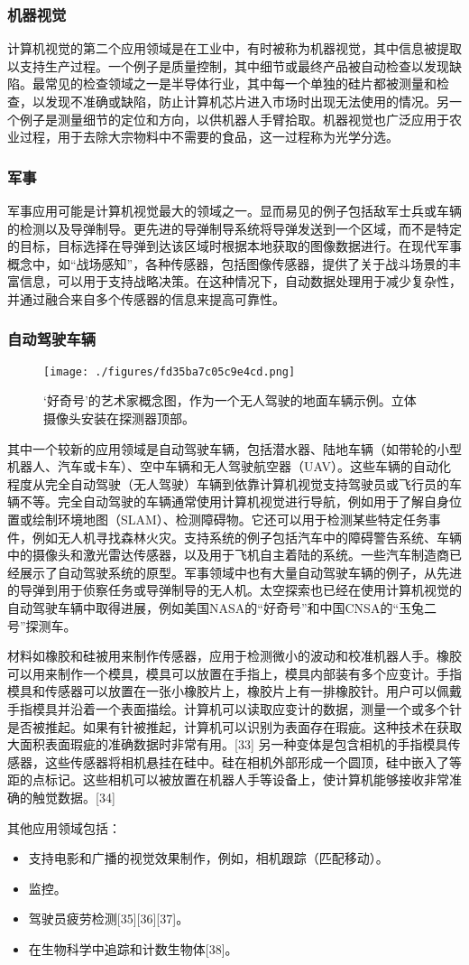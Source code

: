 \subsubsection{机器视觉}
计算机视觉的第二个应用领域是在工业中，有时被称为机器视觉，其中信息被提取以支持生产过程。一个例子是质量控制，其中细节或最终产品被自动检查以发现缺陷。最常见的检查领域之一是半导体行业，其中每一个单独的硅片都被测量和检查，以发现不准确或缺陷，防止计算机芯片进入市场时出现无法使用的情况。另一个例子是测量细节的定位和方向，以供机器人手臂拾取。机器视觉也广泛应用于农业过程，用于去除大宗物料中不需要的食品，这一过程称为光学分选。
\subsubsection{军事}
军事应用可能是计算机视觉最大的领域之一。显而易见的例子包括敌军士兵或车辆的检测以及导弹制导。更先进的导弹制导系统将导弹发送到一个区域，而不是特定的目标，目标选择在导弹到达该区域时根据本地获取的图像数据进行。在现代军事概念中，如“战场感知”，各种传感器，包括图像传感器，提供了关于战斗场景的丰富信息，可以用于支持战略决策。在这种情况下，自动数据处理用于减少复杂性，并通过融合来自多个传感器的信息来提高可靠性。
\subsubsection{自动驾驶车辆}
\begin{figure}[ht]
\centering
\texttt{[image: ./figures/fd35ba7c05c9e4cd.png]}
\caption{‘好奇号’的艺术家概念图，作为一个无人驾驶的地面车辆示例。立体摄像头安装在探测器顶部。} \label{fig_JSJ_5}
\end{figure}
其中一个较新的应用领域是自动驾驶车辆，包括潜水器、陆地车辆（如带轮的小型机器人、汽车或卡车）、空中车辆和无人驾驶航空器（UAV）。这些车辆的自动化程度从完全自动驾驶（无人驾驶）车辆到依靠计算机视觉支持驾驶员或飞行员的车辆不等。完全自动驾驶的车辆通常使用计算机视觉进行导航，例如用于了解自身位置或绘制环境地图（SLAM）、检测障碍物。它还可以用于检测某些特定任务事件，例如无人机寻找森林火灾。支持系统的例子包括汽车中的障碍警告系统、车辆中的摄像头和激光雷达传感器，以及用于飞机自主着陆的系统。一些汽车制造商已经展示了自动驾驶系统的原型。军事领域中也有大量自动驾驶车辆的例子，从先进的导弹到用于侦察任务或导弹制导的无人机。太空探索也已经在使用计算机视觉的自动驾驶车辆中取得进展，例如美国NASA的“好奇号”和中国CNSA的“玉兔二号”探测车。


材料如橡胶和硅被用来制作传感器，应用于检测微小的波动和校准机器人手。橡胶可以用来制作一个模具，模具可以放置在手指上，模具内部装有多个应变计。手指模具和传感器可以放置在一张小橡胶片上，橡胶片上有一排橡胶针。用户可以佩戴手指模具并沿着一个表面描绘。计算机可以读取应变计的数据，测量一个或多个针是否被推起。如果有针被推起，计算机可以识别为表面存在瑕疵。这种技术在获取大面积表面瑕疵的准确数据时非常有用。[33] 另一种变体是包含相机的手指模具传感器，这些传感器将相机悬挂在硅中。硅在相机外部形成一个圆顶，硅中嵌入了等距的点标记。这些相机可以被放置在机器人手等设备上，使计算机能够接收非常准确的触觉数据。[34]

其他应用领域包括：
\begin{itemize}
\item 支持电影和广播的视觉效果制作，例如，相机跟踪（匹配移动）。
\item 监控。
\item 驾驶员疲劳检测[35][36][37]。
\item 在生物科学中追踪和计数生物体[38]。
\end{itemize}